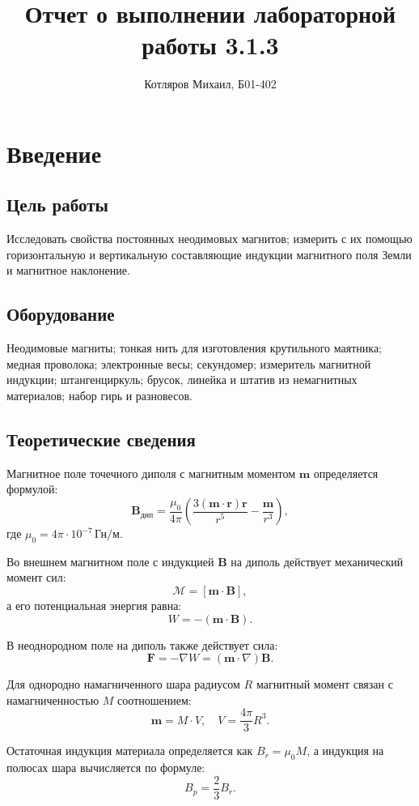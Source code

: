 \documentclass[a4paper]{article}
\title{\textbf{Отчет о выполнении лабораторной работы 3.1.3}}
\date{}
\author{Котляров Михаил, Б01-402}
\begin{document}
\maketitle
	
\section{Введение}

\subsection*{Цель работы}
Исследовать свойства постоянных неодимовых магнитов; измерить с их помощью горизонтальную и вертикальную составляющие индукции магнитного поля Земли и магнитное наклонение.

\subsection*{Оборудование}
Неодимовые магниты; тонкая нить для изготовления крутильного маятника; медная проволока; электронные весы; секундомер; измеритель магнитной индукции; штангенциркуль; брусок, линейка и штатив из немагнитных материалов; набор гирь и разновесов.

\subsection*{Теоретические сведения}
Магнитное поле точечного диполя с магнитным моментом \(\mathbf{m}\) определяется формулой:
\[
\mathbf{B}_{\text{дип}} = \frac{\mu_0}{4\pi} \left( \frac{3(\mathbf{m} \cdot \mathbf{r})\mathbf{r}}{r^5} - \frac{\mathbf{m}}{r^3} \right),
\]
где \(\mu_0 = 4\pi \cdot 10^{-7} \, \text{Гн/м}\).  

Во внешнем магнитном поле с индукцией \(\mathbf{B}\) на диполь действует механический момент сил:
\[
\mathcal{M} = [\mathbf{m} \cdot \mathbf{B}],
\]
а его потенциальная энергия равна:
\[
W = -(\mathbf{m} \cdot \mathbf{B}).
\]

В неоднородном поле на диполь также действует сила:
\[
\mathbf{F} = -\nabla W = (\mathbf{m} \cdot \nabla) \mathbf{B}.
\]

Для однородно намагниченного шара радиусом \(R\) магнитный момент связан с намагниченностью \(M\) соотношением:
\[
\mathbf{m} = M \cdot V, \quad V = \frac{4\pi}{3}R^3.
\]

Остаточная индукция материала определяется как \(B_r = \mu_0 M\), а индукция на полюсах шара вычисляется по формуле:
\[
B_p = \frac{2}{3} B_r.
\]
\end{document}
